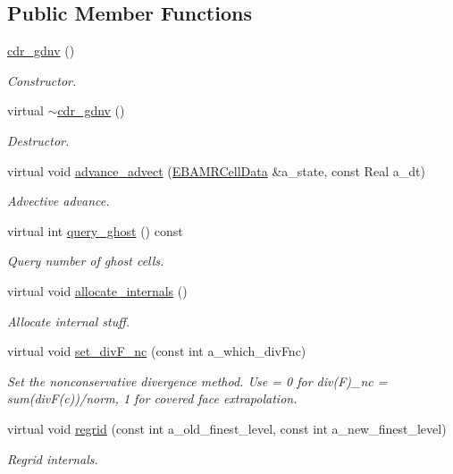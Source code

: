 \subsection*{Public Member Functions}
\begin{DoxyCompactItemize}
\item 
\hyperlink{classcdr__gdnv_a30c85c2a56e3d6f8c3fd41b7889bc91b}{cdr\+\_\+gdnv} ()
\begin{DoxyCompactList}\small\item\em Constructor. \end{DoxyCompactList}\item 
virtual \hyperlink{classcdr__gdnv_a1a0cdbbe10684123fab4bd66997929fb}{$\sim$cdr\+\_\+gdnv} ()
\begin{DoxyCompactList}\small\item\em Destructor. \end{DoxyCompactList}\item 
virtual void \hyperlink{classcdr__gdnv_a67c23a5d23efd60f768a8391c824f32f}{advance\+\_\+advect} (\hyperlink{type__definitions_8H_a7e610f301989e5e07781c5e338bdb7c3}{E\+B\+A\+M\+R\+Cell\+Data} \&a\+\_\+state, const Real a\+\_\+dt)
\begin{DoxyCompactList}\small\item\em Advective advance. \end{DoxyCompactList}\item 
virtual int \hyperlink{classcdr__gdnv_a87203e9cdf20ff1603a73372896a4760}{query\+\_\+ghost} () const 
\begin{DoxyCompactList}\small\item\em Query number of ghost cells. \end{DoxyCompactList}\item 
virtual void \hyperlink{classcdr__gdnv_a5d317bd80bb7076effc1a6f88b8fe9bb}{allocate\+\_\+internals} ()
\begin{DoxyCompactList}\small\item\em Allocate internal stuff. \end{DoxyCompactList}\item 
virtual void \hyperlink{classcdr__gdnv_a1011e40101c60952a4a5b83ee8b5af68}{set\+\_\+div\+F\+\_\+nc} (const int a\+\_\+which\+\_\+div\+Fnc)
\begin{DoxyCompactList}\small\item\em Set the nonconservative divergence method. Use = 0 for div(\+F)\+\_\+nc = sum(div\+F(c))/norm, 1 for covered face extrapolation. \end{DoxyCompactList}\item 
virtual void \hyperlink{classcdr__gdnv_aad413d8eeb1f16663cb9561c44e20f40}{regrid} (const int a\+\_\+old\+\_\+finest\+\_\+level, const int a\+\_\+new\+\_\+finest\+\_\+level)
\begin{DoxyCompactList}\small\item\em Regrid internals. \end{DoxyCompactList}\end{DoxyCompactItemize}
